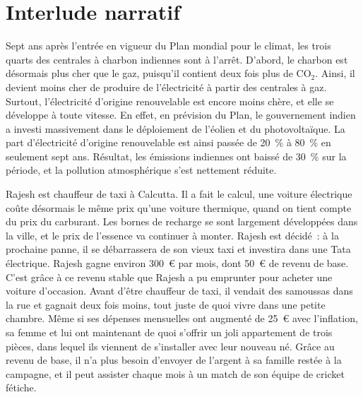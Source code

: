 \documentclass[a5paper,french,openany]{memoir}
\begin{document}
\chapter{Interlude narratif}

Sept ans après l'entrée en vigueur du Plan mondial pour le climat, les trois quarts des centrales à charbon indiennes sont à l'arrêt. D'abord, le charbon est désormais plus cher que le gaz, puisqu'il contient deux fois plus de CO$_\text{2}$. Ainsi, il devient moins cher de produire de l'électricité à partir des centrales à gaz. Surtout, l'électricité d'origine renouvelable est encore moins chère, et elle se développe à toute vitesse. En effet, en prévision du Plan, le gouvernement indien a investi massivement dans le déploiement de l'éolien et du photovoltaïque. La part d'électricité d'origine renouvelable est ainsi passée de 20~\% à 80~\% en seulement sept ans. Résultat, les émissions indiennes ont baissé de 30~\% sur la période, et la pollution atmosphérique s'est nettement réduite. 

Rajesh est chauffeur de taxi à Calcutta. Il a fait le calcul, une voiture électrique coûte désormais le même prix qu'une voiture thermique, quand on tient compte du prix du carburant. Les bornes de recharge se sont largement développées dans la ville, et le prix de l'essence va continuer à monter. Rajesh est décidé~: à la prochaine panne, il se débarrassera de son vieux taxi et investira dans une Tata électrique. Rajesh gagne environ 300~\euro{} par mois, dont 50~\euro{} de revenu de base. C'est grâce à ce revenu stable que Rajesh a pu emprunter pour acheter une voiture d'occasion. %
Avant d'être chauffeur de taxi, il vendait des samoussas dans la rue et gagnait deux fois moins, tout juste de quoi vivre dans une petite chambre. Même si ses dépenses mensuelles ont augmenté de 25~\euro{} avec l'inflation, sa femme et lui ont maintenant de quoi s'offrir un joli appartement de trois pièces, dans lequel ils viennent de s'installer avec leur nouveau né. Grâce au revenu de base, il n'a plus besoin d'envoyer de l'argent à sa famille restée à la campagne, et il peut assister chaque mois à un match de son équipe de cricket fétiche. 
\end{document}

